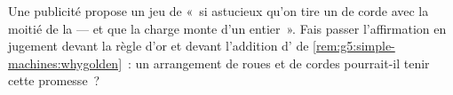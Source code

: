 \begin{exercise}[$\star\star$]\label{exo:g5:simple-machines:11}
Une publicité propose un jeu de  «~si astucieux qu'on tire un
 de corde avec la moitié de la  --- et que la charge monte
d'un  entier~». Fais passer l'affirmation en jugement devant la
règle d'or et devant l'addition d' de
\cref{rem:g5:simple-machines:whygolden}~: un arrangement de roues et
de cordes pourrait-il tenir cette promesse~?
\end{exercise}
